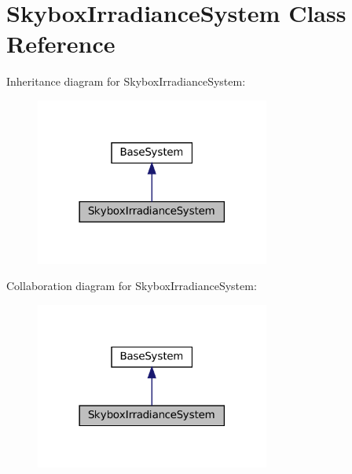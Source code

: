 \hypertarget{classSkyboxIrradianceSystem}{}\section{Skybox\+Irradiance\+System Class Reference}
\label{classSkyboxIrradianceSystem}


Inheritance diagram for Skybox\+Irradiance\+System\+:\nopagebreak
\begin{figure}[H]
\begin{center}
\leavevmode
\includegraphics[width=218pt]{classSkyboxIrradianceSystem__inherit__graph}
\end{center}
\end{figure}


Collaboration diagram for Skybox\+Irradiance\+System\+:\nopagebreak
\begin{figure}[H]
\begin{center}
\leavevmode
\includegraphics[width=218pt]{classSkyboxIrradianceSystem__coll__graph}
\end{center}
\end{figure}
